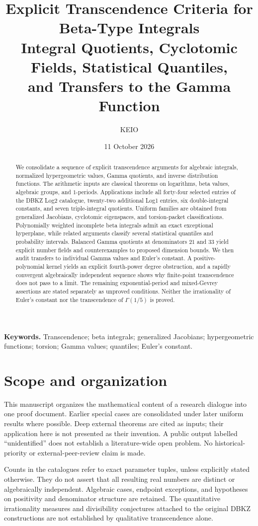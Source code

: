 \documentclass[11pt,a4paper]{article}
\title{\bfseries Explicit Transcendence Criteria for Beta-Type Integrals\\[5pt]
\large Integral Quotients, Cyclotomic Fields, Statistical Quantiles,\\and Transfers to the Gamma Function}
\author{KEIO}
\date{11 October 2026}
\theoremstyle{definition}
\theoremstyle{remark}
\numberwithin{equation}{section}
\begin{document}
\maketitle
\begin{abstract}
We consolidate a sequence of explicit transcendence arguments for algebraic
integrals, normalized hypergeometric values, Gamma quotients, and inverse
distribution functions. The arithmetic inputs are classical theorems on
logarithms, beta values, algebraic groups, and $1$-periods. Applications include
all forty-four selected entries of the DBKZ Log2 catalogue, twenty-two
additional Log1 entries, six double-integral constants, and seven
triple-integral quotients. Uniform families are obtained from generalized
Jacobians, cyclotomic eigenspaces, and torsion-packet classifications.
Polynomially weighted incomplete beta integrals admit an exact exceptional
hyperplane, while related arguments classify several statistical quantiles
and probability intervals. Balanced Gamma quotients at denominators $21$
and $33$ yield explicit number fields and counterexamples to proposed
dimension bounds. We then audit transfers to individual Gamma values and
Euler's constant. A positive-polynomial kernel yields an explicit fourth-power
degree obstruction, and a rapidly convergent algebraically independent
sequence shows why finite-point transcendence does not pass to a limit.
The remaining exponential-period and mixed-Gevrey assertions are stated
separately as unproved conditions. Neither the irrationality of Euler's
constant nor the transcendence of $\Gamma(1/5)$ is proved.
\end{abstract}
\noindent\textbf{Keywords.} Transcendence; beta integrals; generalized Jacobians;
hypergeometric functions; torsion; Gamma values; quantiles; Euler's constant.

\section*{Scope and organization}
This manuscript organizes the mathematical content of a research dialogue
into one proof document. Earlier special cases are consolidated under later
uniform results where possible. Deep external theorems are cited as inputs;
their application here is not presented as their invention. A public output
labelled ``unidentified'' does not establish a literature-wide open problem.
No historical-priority or external-peer-review claim is made.

Counts in the catalogues refer to exact parameter tuples, unless explicitly
stated otherwise. They do not assert that all resulting real numbers are
distinct or algebraically independent. Algebraic cases, endpoint exceptions,
and hypotheses on positivity and denominator structure are retained.
The quantitative irrationality measures and divisibility conjectures attached
to the original DBKZ constructions are not established by qualitative
transcendence alone.
\end{document}
